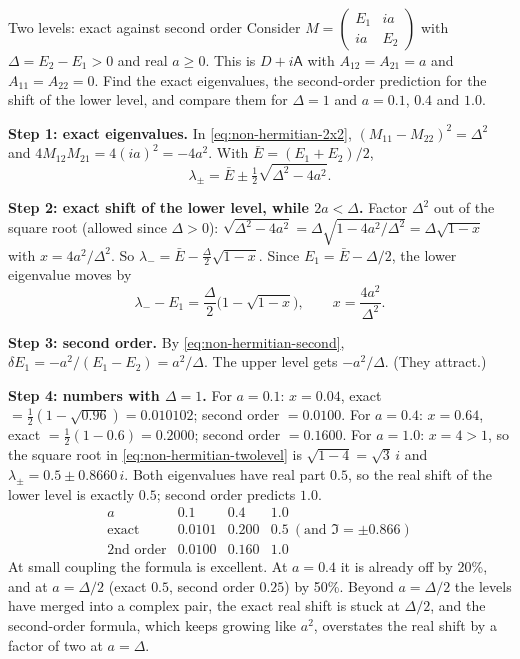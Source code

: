 \begin{sample}{Two levels: exact against second order}
Consider $M=\begin{pmatrix}E_1 & ia\\ ia & E_2\end{pmatrix}$ with $\Delta = E_2-E_1>0$ and real $a\ge0$. This is $D+i\mathsf A$ with $A_{12}=A_{21}=a$ and $A_{11}=A_{22}=0$. Find the exact eigenvalues, the second-order prediction for the shift of the lower level, and compare them for $\Delta=1$ and $a=0.1$, $0.4$ and $1.0$.

\textbf{Step 1: exact eigenvalues.} In \eqref{eq:non-hermitian-2x2}, $(M_{11}-M_{22})^2=\Delta^2$ and $4M_{12}M_{21}=4(ia)^2=-4a^2$. With $\bar E=(E_1+E_2)/2$,
\begin{equation}
\lambda_\pm = \bar E \pm \tfrac12\sqrt{\Delta^2-4a^2}.
\label{eq:non-hermitian-twolevel}
\end{equation}

\textbf{Step 2: exact shift of the lower level, while $2a<\Delta$.} Factor $\Delta^2$ out of the square root (allowed since $\Delta>0$): $\sqrt{\Delta^2-4a^2}=\Delta\sqrt{1-4a^2/\Delta^2}=\Delta\sqrt{1-x}$ with $x=4a^2/\Delta^2$. So $\lambda_-=\bar E-\tfrac\Delta2\sqrt{1-x}$. Since $E_1=\bar E-\Delta/2$, the lower eigenvalue moves by
\begin{equation}
\lambda_- - E_1 = \frac{\Delta}{2}\bigl(1-\sqrt{1-x}\bigr), \qquad x=\frac{4a^2}{\Delta^2}.
\label{eq:non-hermitian-twolevelshift}
\end{equation}

\textbf{Step 3: second order.} By \eqref{eq:non-hermitian-second}, $\delta E_1 = -a^2/(E_1-E_2) = a^2/\Delta$. The upper level gets $-a^2/\Delta$. (They attract.)

\textbf{Step 4: numbers with $\Delta=1$.}
For $a=0.1$: $x=0.04$, exact $=\tfrac12(1-\sqrt{0.96})=0.010102$; second order $=0.0100$.
For $a=0.4$: $x=0.64$, exact $=\tfrac12(1-0.6)=0.2000$; second order $=0.1600$.
For $a=1.0$: $x=4>1$, so the square root in \eqref{eq:non-hermitian-twolevel} is $\sqrt{1-4}=\sqrt3\,i$ and $\lambda_\pm = 0.5\pm0.8660\,i$. Both eigenvalues have real part $0.5$, so the real shift of the lower level is exactly $0.5$; second order predicts $1.0$.
\[
\boxed{\begin{array}{c|ccc} a & 0.1 & 0.4 & 1.0\\\hline \text{exact} & 0.0101 & 0.200 & 0.5\ (\text{and } \Im=\pm0.866)\\ \text{2nd order} & 0.0100 & 0.160 & 1.0\end{array}}
\]
At small coupling the formula is excellent. At $a=0.4$ it is already off by 20\%, and at $a=\Delta/2$ (exact $0.5$, second order $0.25$) by 50\%. Beyond $a=\Delta/2$ the levels have merged into a complex pair, the exact real shift is stuck at $\Delta/2$, and the second-order formula, which keeps growing like $a^2$, overstates the real shift by a factor of two at $a=\Delta$.
\end{sample}

